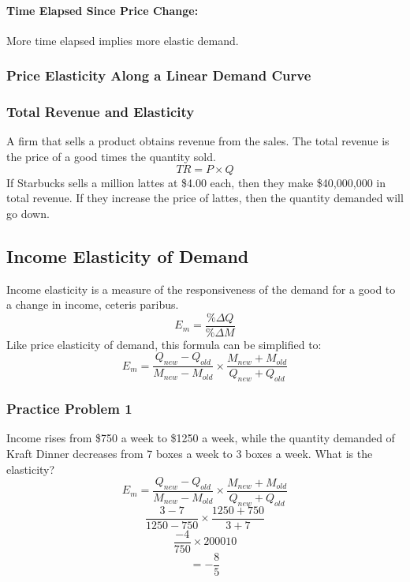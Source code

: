 \documentclass[letterpaper, 12pt]{article}
\begin{document}
\paragraph{Time Elapsed Since Price Change:}
More time elapsed implies more elastic demand.

\subsubsection{Price Elasticity Along a Linear Demand Curve}
\begin{center}
\end{center}

\subsubsection{Total Revenue and Elasticity}
A firm that sells a product obtains revenue from the sales. The total revenue
is the price of a good times the quantity sold.
\[ TR = P \times Q \]
If Starbucks sells a million lattes at \$4.00 each, then they make \$40,000,000
in total revenue. If they increase the price of lattes, then the quantity
demanded will go down.

\subsection{Income Elasticity of Demand}
Income elasticity is a measure of the responsiveness of the demand for a good to a change in income, ceteris paribus.
\[ E_{m} = \frac{\%\Delta Q}{\%\Delta M} \]
Like price elasticity of demand, this formula can be simplified to:
\[ E_{m} = \frac{Q_{new}-Q_{old}}{M_{new}-M_{old}}\times
           \frac{M_{new}+M_{old}}{Q_{new}+Q_{old}} \]

\subsubsection{Practice Problem 1}
Income rises from \$750 a week to \$1250 a week, while the quantity demanded
of Kraft Dinner decreases from 7 boxes a week to 3 boxes a week. What is the
elasticity?
\[ E_{m} = \frac{Q_{new}-Q_{old}}{M_{new}-M_{old}}\times
           \frac{M_{new}+M_{old}}{Q_{new}+Q_{old}} \]
\[ \frac{3-7}{1250-750}\times\frac{1250+750}{3+7} \]
\[ \frac{-4}{750}\times{2000}{10} \]
\[ = -\frac{8}{5} \]
\end{document}
